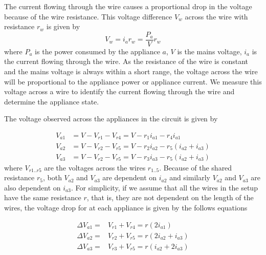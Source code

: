 The current flowing through the wire causes a proportional drop in the voltage because of the wire resistance.
This voltage difference $ V_w$ across the wire with resistance $r_w$ is given by
	\begin{equation}
	 V_w = i_a r_w = \frac{P_a}{V} r_w
	\end{equation}
where $P_a$ is the power consumed by the appliance $a$, $V$ is the mains voltage, $i_a$ is the current flowing through the wire. As the resistance of the wire is constant and the mains voltage is always within a short range, the voltage across the wire will be proportional to the appliance power or appliance current.
We measure this voltage across a wire to identify the current flowing through the wire and determine the appliance state.


	The voltage observed across the appliances in the circuit is given by

	\begin{equation}
		\begin{split}
			V_{a1} & = V - V_{r1} - V_{r4}
			= V - r_1 i_{a1} - r_4 i_{a1} \\
			V_{a2} & = V - V_{r2} - V_{r5}
			= V - r_2 i_{a2} - r_5 ( i_{a2} + i_{a3}) \\
			V_{a3} & = V - V_{r2} - V_{r5}
			= V - r_3 i_{a3} - r_5 ( i_{a2} + i_{a3})
		\end{split}
	\end{equation}
	where $V_{r1..r5}$ are the voltages across the wires $r_{1..5}$.
Because of the shared resistance $r_5$, both $V_{a2}$ and $V_{a3}$ are dependent on $i_{a2}$ and similarly $V_{a2}$ and $V_{a3}$ are also dependent on $i_{a3}$.
For simplicity, if we assume that all the wires in the setup have the same resistance $r$, that is, they are not dependent on the length of the wires,
the voltage drop for at each appliance is given by the follows equations

	\begin{equation}\label{eq:voltageDrop}
		\begin{split}
			\Delta V_{a1} = & V_{r1} + V_{r4} = r (2 i_{a1}) \\
			\Delta V_{a2} = & V_{r2} + V_{r5} = r (2 i_{a2} + i_{a3}) \\
			\Delta V_{a3} = & V_{r3} + V_{r5} = r ( i_{a2} + 2 i_{a3} )
		\end{split}
	\end{equation}

